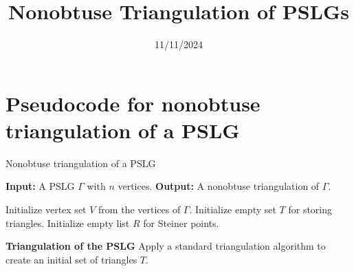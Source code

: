 \documentclass{article}
\begin{document}
 
\title{Nonobtuse Triangulation of PSLGs}
\author{}
\date{11/11/2024}
\maketitle
 
\section{Pseudocode for nonobtuse triangulation of a PSLG}
\begin{algorithm}
\caption{Nonobtuse triangulation of a PSLG}
\begin{algorithmic}[1]
 
\State \textbf{Input:} A PSLG $\Gamma$ with $n$ vertices.
\State \textbf{Output:} A nonobtuse triangulation of $\Gamma$.
 
\State Initialize vertex set $V$ from the vertices of $\Gamma$.
\State Initialize empty set $T$ for storing triangles.
\State Initialize empty list $R$ for Steiner points.
 
\State \textbf{Triangulation of the PSLG}
        \State Apply a standard triangulation algorithm to create an initial set of triangles $T$.
 

\end{algorithmic}
\end{algorithm}
\end{document}
